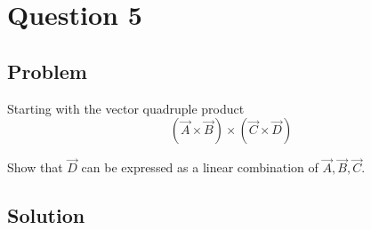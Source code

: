 \documentclass[12pt]{article}
\begin{document}
\section{Question 5}

\subsection{Problem}

Starting with the vector quadruple product
\[
    (\vec{A} \times \vec{B}) \times(\vec{C} \times \vec{D})
\]

Show that \(\vec{D}\) can be expressed as a linear combination of \(\vec{A}, \vec{B}, \vec{C}\).

\subsection{Solution}



\nocite{El-Deeb_PEU-218_Assignments}
\end{document}
